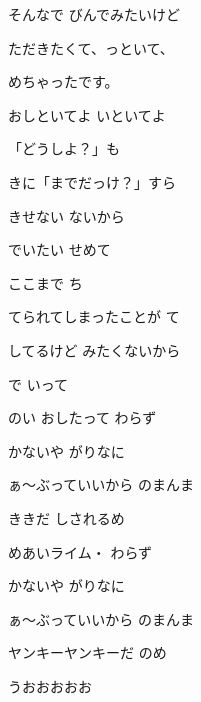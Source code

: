 \documentclass[a4paper,tate,twocolumn,12pt]{ltjtarticle}
\begin{document}
\begin{flushleft}
\begin{minipage}{\linewidth}
そんなで びんでみたいけど

ただきたくて、っといて、

めちゃったです。

おしといてよ いといてよ
\end{minipage}

\vspace{2em}

\noindent\begin{minipage}{\linewidth}
「どうしよ？」も

きに「までだっけ？」すら

きせない ないから

でいたい せめて

ここまで ち

てられてしまったことが て

してるけど みたくないから

で いって
\end{minipage}

\vspace{2em}

\noindent\begin{minipage}{\linewidth}
のい おしたって わらず

かないや がりなに

ぁ～ぶっていいから のまんま

ききだ しされるめ

めあいライム・ わらず

かないや がりなに

ぁ～ぶっていいから のまんま

ヤンキーヤンキーだ のめ

うおおおおお
\end{minipage}


\end{flushleft}
\end{document}
